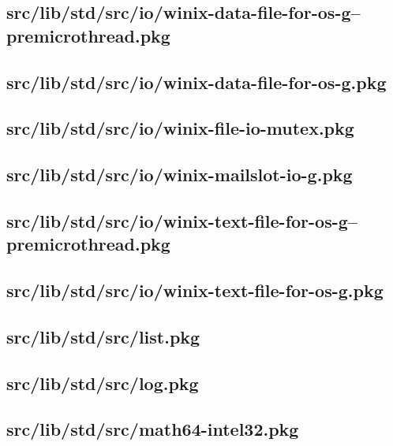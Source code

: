 \subsection{src/lib/std/src/io/winix-data-file-for-os-g--premicrothread.pkg}


\subsection{src/lib/std/src/io/winix-data-file-for-os-g.pkg}


\subsection{src/lib/std/src/io/winix-file-io-mutex.pkg}


\subsection{src/lib/std/src/io/winix-mailslot-io-g.pkg}


\subsection{src/lib/std/src/io/winix-text-file-for-os-g--premicrothread.pkg}


\subsection{src/lib/std/src/io/winix-text-file-for-os-g.pkg}


\subsection{src/lib/std/src/list.pkg}


\subsection{src/lib/std/src/log.pkg}


\subsection{src/lib/std/src/math64-intel32.pkg}


